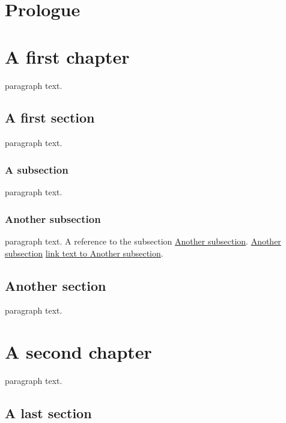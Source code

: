 \chapter*{Prologue}
\label{s:1}
\chapter{A first chapter}
\label{s:2}
\setcounter{tocdepth}{3}
\minitoc

paragraph text.

\section{A first section}
\label{s:3}
paragraph text.

\subsection{A subsection}
\label{s:4}
paragraph text.

\subsection{Another subsection}
\label{s:5}
paragraph text. A reference to the subsection
\hyperref[s:5]{Another subsection}.
\hyperref[s:5]{Another subsection}
\hyperref[s:5]{link text to Another subsection}.

\section{Another section}
\label{s:6}
paragraph text.

\chapter{A second chapter}
\label{s:7}
paragraph text.

\section{A last section}
\label{s:8}
\setcounter{tocdepth}{3}
\tableofcontents
\setcounter{tocdepth}{0}
\tableofcontents
\setcounter{tocdepth}{3}
\tableofcontents
\setcounter{tocdepth}{3}
\tableofcontents
\setcounter{tocdepth}{3}
\minitoc
